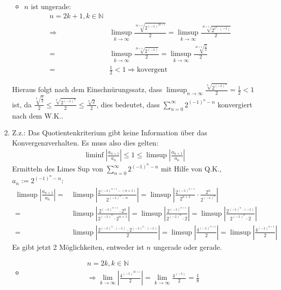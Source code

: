 \begin{lsg}
\begin{enumerate}[label=$\mathrm{(\roman*)}$, ref=$\mathrm{\roman*}$]
\begin{itemize}
\item $n$ ist ungerade:
\begin{align*}
n = 2k+1 ,k \in \mathbb{N} \\
\Rightarrow &\limsup_{k \to \infty}\frac{\sqrt[2k+1]{2^{(-1)^{2k+1}}}}{2} = \limsup_{k \to \infty}\frac{\sqrt[2k+1]{2^{1^k \cdot (-1)}}}{2} \\
= &\limsup_{k \to \infty}\frac{\sqrt[2k+1]{2^{(-1)}}}{2} = \limsup_{k \to \infty}\frac{\sqrt[2k+1]{\frac{1}{2}}}{2} \\
= &\frac{1}{2} < 1 \Rightarrow \text{kovergent}
\end{align*}
\end{itemize}
Hieraus folgt nach dem Einschnürungssatz, dass $\limsup_{n \to \infty}\frac{\sqrt[n]{2^{(-1)^n}}}{2} = \frac{1}{2} < 1$ ist, da $\frac{\sqrt[n]{\frac{1}{2}}}{2} \leq \frac{\sqrt[n]{2^{(-1)^n}}}{2} \leq \frac{\sqrt[n]{2}}{2}$, dies bedeutet, dass $\sum^{\infty}_{n=0} 2^{(-1)^n - n}$ konvergiert nach dem W.K..
\item Z.z.: Das Quotientenkriterium gibt keine Information über das Konvergenzverhalten. Es muss also dies gelten:
\begin{align*}
\liminf\left|\frac{a_{n+1}}{a_n}\right|\leq 1 \leq \limsup\left|\frac{a_{n+1}}{a_n}\right|
\end{align*}
Ermitteln des Limes Sup von $\sum^{\infty}_{n=0} 2^{(-1)^n - n}$ mit Hilfe von Q.K., $a_n:=2^{(-1)^n - n}$:
\begin{align*}
\limsup\left|\frac{a_{n+1}}{a_n}\right| = &\limsup\left|\frac{2^{(-1)^{n+1}-(n+1)}}{2^{(-1)^n - n}}\right| = \limsup\left|\frac{2^{(-1)^{n+1}}}{2^{n+1}}\cdot \frac{2^n}{2^{(-1)^n}}\right| \\
=& \limsup\left|\frac{2^{(-1)^{n+1}}\cdot 2^n}{2^{(-1)^n}\cdot 2^{n+1}}\right| = \limsup\left|\frac{2^{(-1)^{n+1}}}{2^{(-1)^n}\cdot 2}\right| = \limsup\left|\frac{2^{(-1)^n \cdot (-1)}}{2^{(-1)^n}\cdot 2}\right| \\
=& \limsup\left|\frac{2^{(-1)^n \cdot (-1)}\cdot 2^{(-1)^n \cdot (-1)}}{2}\right| = \limsup\left|\frac{4^{(-1)^{n+1}}}{2}\right| = \limsup\left|\frac{4^{(-1)^{n+1}}}{2}\right|
\end{align*}
Es gibt jetzt 2 Möglichkeiten, entweder ist $n$ ungerade oder gerade.
\begin{itemize}
\item \begin{align*}
&n = 2k ,k \in \mathbb{N} \\
&\Rightarrow \lim_{k \to \infty}\left|\frac{4^{(-1)^{2k+1}}}{2}\right| = \lim_{k \to \infty}\frac{4^{(-1)}}{2}= \frac{1}{8}

\end{align*}
\end{itemize}
\end{enumerate}
\end{lsg}
